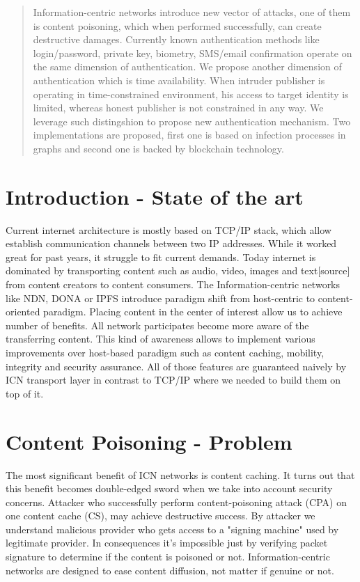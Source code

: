 \documentclass[nostrict]{szablonPG}
\begin{document}
\tableofcontents
\listoffigures


\begin{abstract}
Information-centric networks introduce new vector of attacks, one of them is content poisoning, which when performed successfully, can create destructive damages. Currently known authentication methods like login/password, private key, biometry, SMS/email confirmation operate on the same dimension of authentication. We propose another dimension of authentication which is time availability. When intruder publisher is operating in time-constrained environment, his access to target identity is limited, whereas honest publisher is not constrained in any way. We leverage such distingshion to propose new authentication mechanism. Two implementations are proposed, first one is based on infection processes in graphs and second one is backed by blockchain technology. 


\end{abstract}



\section{Introduction - State of the art}
Current internet architecture is mostly based on TCP/IP stack, which allow  establish communication channels between two IP addresses. While it worked great for past years,  it struggle to fit current demands. Today internet is dominated by transporting content such as audio, video, images and text[source] from content creators to content consumers.
The Information-centric networks like NDN\cite{zhang2014named}, DONA\cite{koponen2007data} or IPFS \cite{benet2014ipfs} introduce paradigm shift from host-centric to content-oriented paradigm. Placing content in the center of interest allow us to achieve number of benefits. All network participates become more aware of the transferring content. This kind of awareness allows to implement various improvements over host-based paradigm such as content caching, mobility, integrity and security assurance. All of those features are guaranteed naively by ICN transport layer in contrast to TCP/IP where we needed to build them on top of it.

\section{Content Poisoning - Problem}
The most significant benefit of ICN networks is content caching. It turns out that this benefit becomes double-edged sword when we take into account security concerns. Attacker who successfully perform content-poisoning attack (CPA) on one content cache (CS), may achieve destructive success.
By attacker we understand malicious provider who gets access to a "signing machine" used by legitimate provider. In consequences it's impossible just by verifying packet signature to determine if the content is poisoned or not. Information-centric networks are designed to ease content diffusion, not matter if genuine or not. 
\end{document}
